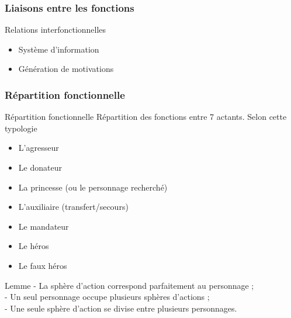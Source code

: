 \documentclass{beamer}
\begin{document}
\subsubsection{Liaisons entre les fonctions}
\begin{frame}{Relations interfonctionnelles}
  \begin{itemize}
    \item Système d'information
    \item Génération de motivations
  \end{itemize}
\end{frame}

\subsubsection{Répartition fonctionnelle}
\begin{frame}{Répartition fonctionnelle}
  Répartition des fonctions entre 7 actants. Selon cette typologie
  \begin{itemize}
    \item L'agresseur
    \item Le donateur
    \item La princesse (ou le personnage recherché)
    \item L'auxiliaire (transfert/secours)
    \item Le mandateur 
    \item Le héros
    \item Le faux héros
  \end{itemize}
  \begin{block}{Lemme}
   - La sphère d'action correspond parfaitement au personnage ;\\
   - Un seul personnage occupe plusieurs sphères d'actions ;\\
   - Une seule sphère d'action se divise entre plusieurs personnages.\\
  \end{block}
\end{frame}
\end{document}

